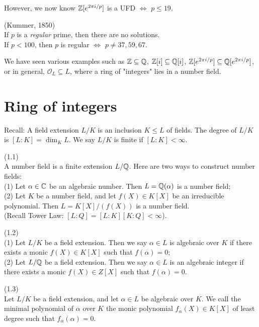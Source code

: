 \documentclass[a4paper]{article}
\begin{document}
However, we now know $\mathbb{Z}[e^{2\pi i/p}]$ is a UFD $\iff$ $p \leq 19$.

\begin{thm} (Kummer, 1850)\\
If $p$ is a \emph{regular} prime, then there are no solutions.\\
If $p<100$, then $p$ is regular $\iff$ $p \neq 37,59,67$.
\end{thm}

We have seen various examples such as $\mathbb{Z} \subseteq \mathbb{Q}$, $\mathbb{Z}[i] \subseteq \mathbb{Q}[i]$, $\mathbb{Z}[e^{2\pi i/p}] \subseteq \mathbb{Q}[e^{2\pi i/p}]$, or in general, $\mathcal{O}_L\subseteq L$, where a ring of "integers" lies in a number field.

\newpage

\section{Ring of integers}
Recall: A field extension $L/K$ is an inclusion $K \leq L$ of fields. The degree of $L/K$ is $[L:K] = \dim_K L$. We say $L/K$ is finite if $[L:K]<\infty$.

\begin{defi} (1.1)\\
A number field is a finite extension $L/\mathbb{Q}$. Here are two ways to construct number fields:\\
(1) Let $\alpha \in \mathbb{C}$ be an algebraic number. Then $L=\mathbb{Q}(\alpha)$ is a number field;\\
(2) Let $K$ be a number field, and let $f(X) \in K[X]$ be an irreducible polynomial. Then $L=K[X]/(f(X))$ is a number field.\\
(Recall Tower Law: $[L:Q] = [L:K][K:Q] < \infty$).
\end{defi}

\begin{defi} (1.2)\\
(1) Let $L/K$ be a field extension. Then we say $\alpha \in L$ is algebraic over $K$ if there exists a monic $f(X) \in K[X]$ such that $f(\alpha) = 0$;\\
(2) Let $L/\mathbb{Q}$ be a field extension. Then we say $\alpha \in L$ is an algebraic integer if there exists a monic $f(X) \in Z[X]$ such that $f(\alpha) = 0$.
\end{defi}

\begin{defi} (1.3)\\
Let $L/K$ be a field extension, and let $\alpha \in L$ be algebraic over $K$. We call the minimal polynomial of $\alpha$ over $K$ the monic polynomial $f_\alpha(X) \in K[X]$ of least degree such that $f_\alpha(\alpha)=0$.
\end{defi}
\end{document}
